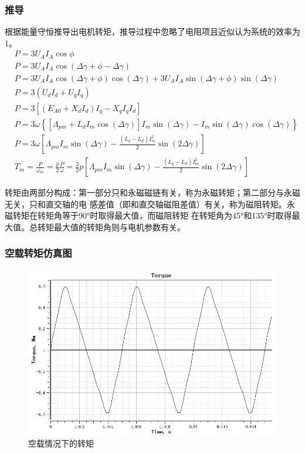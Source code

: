 \documentclass{thuemp}
\begin{document}
\subsubsection{推导}
根据能量守恒推导出电机转矩，推导过程中忽略了电阻项且近似认为系统的效率为1。
$$\begin{aligned}
  &P=3U_{A}I_{A}\operatorname{cos}\phi   \\
  & P=3U_{A}I_{A}\operatorname{cos}(\Delta\gamma+\phi-\Delta\gamma)  \\
  & P=3U_{A}I_{A}\operatorname{cos}(\Delta\gamma+\phi)\operatorname{cos}(\Delta\gamma)+3U_{A}I_{A}\operatorname{sin}(\Delta\gamma+\phi)\operatorname{sin}(\Delta\gamma)  \\
  & P=3\left(U_{d}I_{d}+U_{q}I_{q}\right)  \\
  &P=3\left[\left(E_{A0}+X_{d}I_{d}\right)I_{q}-X_{q}I_{q}I_{d}\right] \\
  &P=3\omega\left\{\left[\Lambda_{pm}+L_{d}I_{m}\operatorname{cos}(\Delta\gamma)\right]I_{m}\operatorname{sin}(\Delta\gamma)-I_{m}\operatorname{sin}(\Delta\gamma)\operatorname{cos}(\Delta\gamma)\right\} \\
  &P=3\omega\left[\Lambda_{pm}I_{m}\operatorname{sin}(\Delta\gamma)-\frac{(L_{q}-L_{d})I_{m}^{2}}2\operatorname{sin}(2\Delta\gamma)\right] \\
  &T_{m}=\frac{P}{\omega_{m}}=\frac{p}{2}\frac{P}{\omega}=\frac{3}{2}p\left[\Lambda_{pm}I_{m}\sin(\Delta\gamma)-\frac{(L_{q}-L_{d})I_{m}^{2}}{2}\sin(2\Delta\gamma)\right]
  \end{aligned}$$

转矩由两部分构成：第一部分只和永磁磁链有关，称为永磁转矩；第二部分与永磁无关，只和直交轴的电
感差值（即和直交轴磁阻差值）有关，称为磁阻转矩。永磁转矩在转矩角等于90°时取得最大值，而磁阻转矩
在转矩角为45°和135°时取得最大值。总转矩最大值的转矩角则与电机参数有关。

\subsubsection{空载转矩仿真图}
\begin{figure}[H]
  \centering
  \includegraphics[width=1\linewidth]{./img/task1/noload-torque.png}
  \caption{空载情况下的转矩}
\end{figure}
\end{document}
